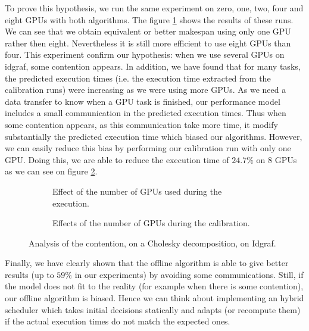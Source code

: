 \documentclass[10pt, conference, compsocconf,pdftex,dvipsnames]{IEEEtran}
\begin{document}
To prove this hypothesis, we run the same experiment on zero, one, two, four
and eight GPUs with both algorithms. The figure \ref{fig:ContentionGpu} shows
the results of these runs.  We can see that we obtain equivalent or better
makespan using only one GPU rather then eight.  Nevertheless it is still more
efficient to use eight GPUs than four. This experiment confirm our hypothesis:
when we use several GPUs on idgraf, some contention appears. In addition, we
have found that for many tasks, the predicted execution times (i.e. the
execution time extracted from the calibration runs) were increasing as we were
using more GPUs. As we need a data transfer to know when a GPU task is
finished, our performance model includes a small communication in the
predicted execution times. Thus when some contention appears, as this
communication take more time, it modify substantially the predicted execution
time which biased our algorithms.  However, we can easily reduce this bias by
performing our calibration run with only one GPU.  Doing this, we are able to
reduce the execution time of $24.7\%$ on 8 GPUs as we can see on figure
\ref{fig:ContentionTrick}.

\begin{figure}[htb]
    \centering
    \begin{subfigure}{0.5\textwidth}
        \scalebox{0.65}{
            
        }
        \caption{Effect of the number of GPUs used during the execution.}
        \label{fig:ContentionGpu}
    \end{subfigure}
    \begin{subfigure}{0.5\textwidth}
        \scalebox{0.65}{
            
        }
        \caption{Effects of the number of GPUs during the calibration.}
        \label{fig:ContentionTrick}
    \end{subfigure}
    \caption{Analysis of the contention, on a 
    Cholesky decomposition, on Idgraf.}
    \label{fig:Contention}
\end{figure}

Finally, we have clearly shown that the offline algorithm is able to give
better results (up to $59\%$ in our experiments) by avoiding some
communications. Still, if the model does not fit to the reality (for example
when there is some contention), our offline algorithm is biased. Hence we can
think about implementing an hybrid scheduler which takes initial decisions
statically and adapts (or recompute them) if the actual execution times do not
match the expected ones.
\end{document}
